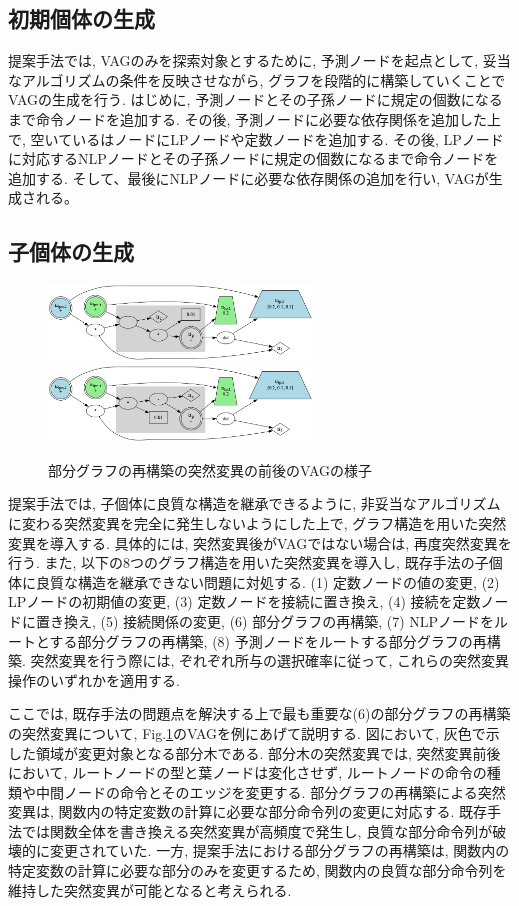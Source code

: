 \documentclass[a4paper,11pt,twocolumn]{jarticle}
\begin{document}
\subsection{初期個体の生成}
提案手法では, VAGのみを探索対象とするために, 予測ノードを起点として, 妥当なアルゴリズムの条件を反映させながら, グラフを段階的に構築していくことでVAGの生成を行う. はじめに, 予測ノードとその子孫ノードに規定の個数になるまで命令ノードを追加する. その後, 予測ノードに必要な依存関係を追加した上で, 空いているはノードにLPノードや定数ノードを追加する.  その後, LPノードに対応するNLPノードとその子孫ノードに規定の個数になるまで命令ノードを追加する. そして、最後にNLPノードに必要な依存関係の追加を行い, VAGが生成される。

\subsection{子個体の生成}

\begin{figure}
  \centering
  \includegraphics[width=7cm]{subgraph.png}
  \includegraphics[width=7cm]{mutated_subgraph.png}
  \caption{部分グラフの再構築の突然変異の前後のVAGの様子}
  \label{fig:proposed:mutation:subgraph}
\end{figure}

提案手法では, 子個体に良質な構造を継承できるように, 非妥当なアルゴリズムに変わる突然変異を完全に発生しないようにした上で, グラフ構造を用いた突然変異を導入する. 具体的には, 突然変異後がVAGではない場合は, 再度突然変異を行う. また, 以下の8つのグラフ構造を用いた突然変異を導入し, 既存手法の子個体に良質な構造を継承できない問題に対処する. (1) 定数ノードの値の変更, (2) LPノードの初期値の変更, (3) 定数ノードを接続に置き換え, (4) 接続を定数ノードに置き換え, (5) 接続関係の変更, (6) 部分グラフの再構築, (7) NLPノードをルートとする部分グラフの再構築, (8) 予測ノードをルートする部分グラフの再構築. 突然変異を行う際には, ぞれぞれ所与の選択確率に従って, これらの突然変異操作のいずれかを適用する.

ここでは, 既存手法の問題点を解決する上で最も重要な(6)の部分グラフの再構築の突然変異について, Fig.\ref{fig:proposed:mutation:subgraph}のVAGを例にあげて説明する. 図において, 灰色で示した領域が変更対象となる部分木である. 部分木の突然変異では, 突然変異前後において, ルートノードの型と葉ノードは変化させず, ルートノードの命令の種類や中間ノードの命令とそのエッジを変更する. 部分グラフの再構築による突然変異は, 関数内の特定変数の計算に必要な部分命令列の変更に対応する. 既存手法では関数全体を書き換える突然変異が高頻度で発生し, 良質な部分命令列が破壊的に変更されていた. 一方, 提案手法における部分グラフの再構築は, 関数内の特定変数の計算に必要な部分のみを変更するため, 関数内の良質な部分命令列を維持した突然変異が可能となると考えられる.
\end{document}
